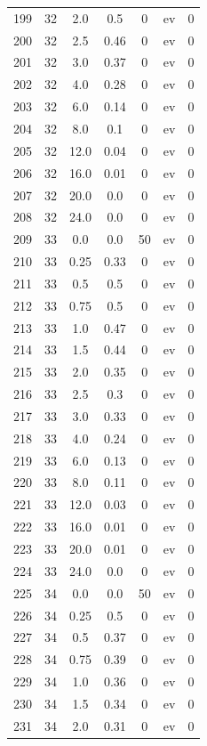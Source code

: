 \documentclass[12pt,a4paper]{article}
\begin{document}
\begin{tabular}{r|cccccc}
	199 & 32 & 2.0 & 0.5 & 0 & ev & 0 \\
	200 & 32 & 2.5 & 0.46 & 0 & ev & 0 \\
	201 & 32 & 3.0 & 0.37 & 0 & ev & 0 \\
	202 & 32 & 4.0 & 0.28 & 0 & ev & 0 \\
	203 & 32 & 6.0 & 0.14 & 0 & ev & 0 \\
	204 & 32 & 8.0 & 0.1 & 0 & ev & 0 \\
	205 & 32 & 12.0 & 0.04 & 0 & ev & 0 \\
	206 & 32 & 16.0 & 0.01 & 0 & ev & 0 \\
	207 & 32 & 20.0 & 0.0 & 0 & ev & 0 \\
	208 & 32 & 24.0 & 0.0 & 0 & ev & 0 \\
	209 & 33 & 0.0 & 0.0 & 50 & ev & 0 \\
	210 & 33 & 0.25 & 0.33 & 0 & ev & 0 \\
	211 & 33 & 0.5 & 0.5 & 0 & ev & 0 \\
	212 & 33 & 0.75 & 0.5 & 0 & ev & 0 \\
	213 & 33 & 1.0 & 0.47 & 0 & ev & 0 \\
	214 & 33 & 1.5 & 0.44 & 0 & ev & 0 \\
	215 & 33 & 2.0 & 0.35 & 0 & ev & 0 \\
	216 & 33 & 2.5 & 0.3 & 0 & ev & 0 \\
	217 & 33 & 3.0 & 0.33 & 0 & ev & 0 \\
	218 & 33 & 4.0 & 0.24 & 0 & ev & 0 \\
	219 & 33 & 6.0 & 0.13 & 0 & ev & 0 \\
	220 & 33 & 8.0 & 0.11 & 0 & ev & 0 \\
	221 & 33 & 12.0 & 0.03 & 0 & ev & 0 \\
	222 & 33 & 16.0 & 0.01 & 0 & ev & 0 \\
	223 & 33 & 20.0 & 0.01 & 0 & ev & 0 \\
	224 & 33 & 24.0 & 0.0 & 0 & ev & 0 \\
	225 & 34 & 0.0 & 0.0 & 50 & ev & 0 \\
	226 & 34 & 0.25 & 0.5 & 0 & ev & 0 \\
	227 & 34 & 0.5 & 0.37 & 0 & ev & 0 \\
	228 & 34 & 0.75 & 0.39 & 0 & ev & 0 \\
	229 & 34 & 1.0 & 0.36 & 0 & ev & 0 \\
	230 & 34 & 1.5 & 0.34 & 0 & ev & 0 \\
	231 & 34 & 2.0 & 0.31 & 0 & ev & 0 \\

\end{tabular}
\end{document}

